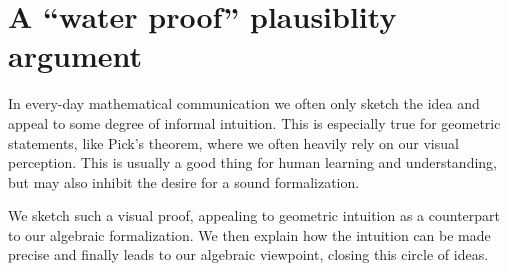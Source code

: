 \documentclass[a4paper]{amsart}
\numberwithin{equation}{section}
\theoremstyle{plain}
\theoremstyle{definition}
\begin{document}
\setcounter{section}{22}
\section{A ``water proof'' plausiblity argument}

In every-day mathematical communication we often only sketch
the idea and appeal to some degree of informal intuition.
This is especially true for geometric statements,
like Pick's theorem, where we often heavily rely on our visual perception.
This is usually a good thing for human learning and understanding,
but may also inhibit the desire for a sound formalization.

We sketch such a visual proof, appealing to geometric intuition
as a counterpart to our algebraic formalization.
We then explain how the intuition can be made precise
and finally leads to our algebraic viewpoint,
closing this circle of ideas.
\end{document}
